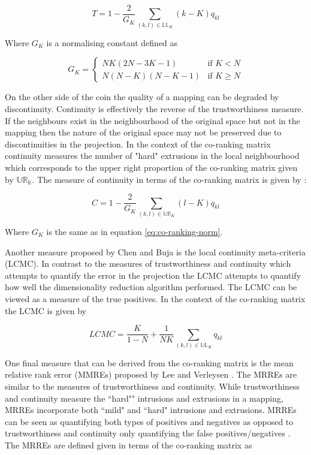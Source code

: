 \begin{equation}
	T = 1 - \frac{2}{G_{K}} \sum\limits_{(k,l) \in \mathbb{LL}_K} (k - K)q_{kl}
\end{equation} 

Where $G_K$ is a normalising constant defined as

\begin{equation}
\label{eq:co-ranking-norm}
	G_K =
\left\{
	\begin{array}{ll}
		NK(2N - 3K - 1)  & \mbox{if } K < N \\
		N(N - K)(N - K - 1) & \mbox{if } K \geq N
	\end{array}
\right.
\end{equation}

On the other side of the coin the quality of a mapping can be degraded by discontinuity. Continuity is effectively the reverse of the trustworthiness measure. If the neighbours exist in the neighbourhood of the original space but not in the mapping then the nature of the original space may not be preserved due to discontinuities in the projection. In the context of the co-ranking matrix continuity measures the number of "hard" extrusions in the local neighbourhood which corresponds to the upper right proportion of the co-ranking matrix given by $\mathbb{UR_K}$. The measure of continuity in terms of the co-ranking matrix is given by \cite{lee2009quality}:

\begin{equation}
	C = 1 - \frac{2}{G_{K}} \sum\limits_{(k,l) \in \mathbb{UR}_K} (l - K)q_{kl}
\end{equation}

Where $G_K$ is the same as in equation \ref{eq:co-ranking-norm}.

Another measure proposed by Chen and Buja \cite{chen2009local} is the local continuity meta-criteria (LCMC). In contrast to the measures of trustworthiness and continuity which attempts to quantify the error in the projection the LCMC attempts to quantify how well the dimensionality reduction algorithm performed. The LCMC can be viewed as a measure of the true positives. In the context of the co-ranking matrix the LCMC is given by

\begin{equation}
	LCMC = \frac{K}{1 - N} + \frac{1}{NK} \sum\limits_{(k,l) \in \mathbb{UL}_K} q_{kl}
\end{equation}

One final measure that can be derived from the co-ranking matrix is the mean relative rank error (MMREs) proposed by Lee and Verleysen \cite{lee2007nonlinear}. The MRREs are similar to the measures of trustworthiness and continuity. While trustworthiness and continuity measure the ``hard"" intrusions and extrusions in a mapping, MRREs incorporate both ``mild" and ``hard" intrusions and extrusions. MRREs can be seen as quantifying both types of positives and negatives as opposed to trustworthiness and continuity only quantifying the false positives/negatives \cite{lee2009quality}. The MRREs are defined given in terms of the co-ranking matrix as

